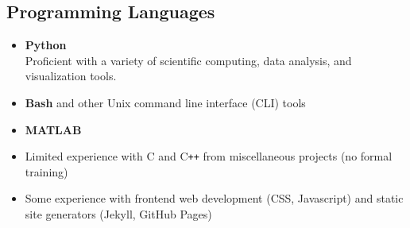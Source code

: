 \documentclass[11pt,letterpaper,sans]{moderncv}
\begin{document}
\subsection{Programming Languages} \vspace{5pt}
\begin{itemize}[itemsep=0pt]
    \item \textbf{Python}\\
        Proficient with a variety of scientific computing, data analysis, and
        visualization tools.

    \item \textbf{Bash} and other Unix command line interface (CLI) tools

   \item \textbf{MATLAB}
   \item Limited experience with C and C\texttt{++} from miscellaneous projects (no formal training)
 \item Some experience with frontend web development (CSS, Javascript) and
       static site generators (Jekyll, GitHub Pages)
\end{itemize}
\end{document}
